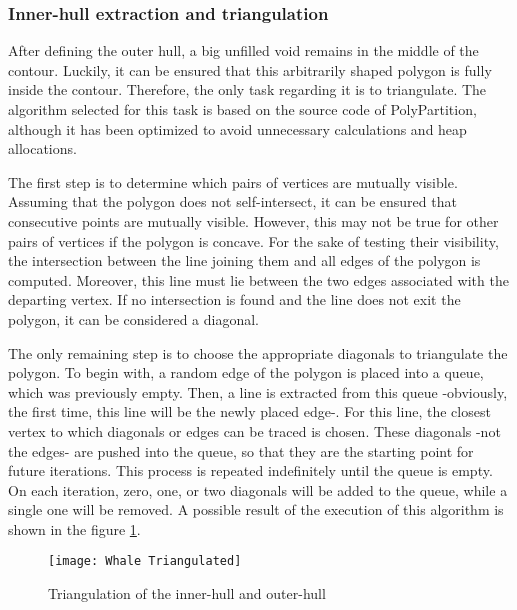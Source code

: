 \documentclass[\topdir/main.tex]{subfiles}
\begin{document}
\subsubsection{Inner-hull extraction and triangulation}
After defining the outer hull, a big unfilled void remains in the middle of the contour. Luckily, it can be ensured that this arbitrarily shaped polygon is fully inside the contour. Therefore, the only task regarding it is to triangulate. The algorithm selected for this task is based on the source code of PolyPartition\cite{polypartition}, although it has been optimized to avoid unnecessary calculations and heap allocations.\newline

The first step is to determine which pairs of vertices are mutually visible. Assuming that the polygon does not self-intersect, it can be ensured that consecutive points are mutually visible. However, this may not be true for other pairs of vertices if the polygon is concave. For the sake of testing their visibility, the intersection between the line joining them and all edges of the polygon is computed. Moreover, this line must lie between the two edges associated with the departing vertex. If no intersection is found and the line does not exit the polygon, it can be considered a diagonal.\newline

The only remaining step is to choose the appropriate diagonals to triangulate the polygon. To begin with, a random edge of the polygon is placed into a queue, which was previously empty. Then, a line is extracted from this queue -obviously, the first time, this line will be the newly placed edge-. For this line, the closest vertex to which diagonals or edges can be traced is chosen. These diagonals -not the edges- are pushed into the queue, so that they are the starting point for future iterations. This process is repeated indefinitely until the queue is empty. On each iteration, zero, one, or two diagonals will be added to the queue, while a single one will be removed. A possible result of the execution of this algorithm is shown in the figure \ref{fig:a01:triangulation}.\newline

\begin{figure}[hbtp]
    \centering
    \texttt{[image: Whale Triangulated]}

    \caption{Triangulation of the inner-hull and outer-hull}
    \label{fig:a01:triangulation}
\end{figure}
\end{document}
